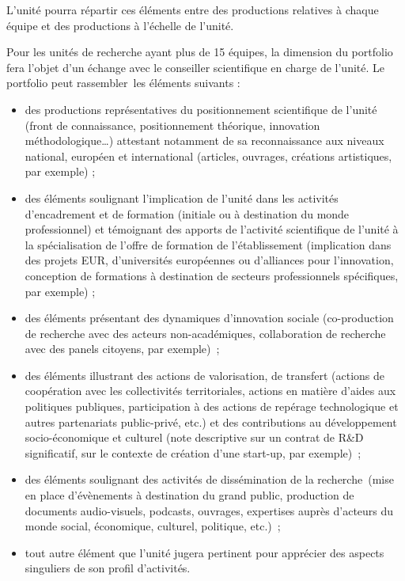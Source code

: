 \documentclass[]{article}
\begin{document}
{L’unité pourra répartir ces éléments entre des productions relatives à chaque équipe et des productions à l’échelle de l’unité.

Pour les unités de recherche ayant plus de 15 équipes, la dimension du portfolio fera l’objet d’un échange avec le conseiller scientifique en charge de l’unité.
Le portfolio peut rassembler les éléments suivants :
\begin{itemize}
\item  des productions représentatives du positionnement scientifique de l’unité (front de connaissance, positionnement théorique, innovation méthodologique…) attestant notamment de sa reconnaissance aux niveaux national, européen et international (articles, ouvrages, créations artistiques, par exemple) ;
\item  des éléments soulignant l’implication de l’unité dans les activités d’encadrement et de formation (initiale ou à destination du monde professionnel) et témoignant des apports de l’activité scientifique de l’unité à la spécialisation de l’offre de formation de l’établissement (implication dans des projets EUR, d’universités européennes ou d’alliances pour l’innovation, conception de formations à destination de secteurs professionnels spécifiques, par exemple) ;
\item  des éléments présentant des dynamiques d’innovation sociale (co-production de recherche avec des acteurs non-académiques, collaboration de recherche avec des panels citoyens, par exemple) ;
\item  des éléments illustrant des actions de valorisation, de transfert (actions de coopération avec les collectivités territoriales, actions en matière d’aides aux politiques publiques, participation à des actions de repérage technologique et autres partenariats public-privé, etc.) et des contributions au développement socio-économique et culturel (note descriptive sur un contrat de R\&D significatif, sur le contexte de création d’une start-up, par exemple) ;
\item  des éléments soulignant des activités de dissémination de la recherche (mise en place d’évènements à destination du grand public, production de documents audio-visuels, podcasts, ouvrages, expertises auprès d’acteurs du monde social, économique, culturel, politique, etc.) ;
\item  tout autre élément que l’unité jugera pertinent pour apprécier des aspects singuliers de son profil d’activités.
\end{itemize}
}
\end{document}
